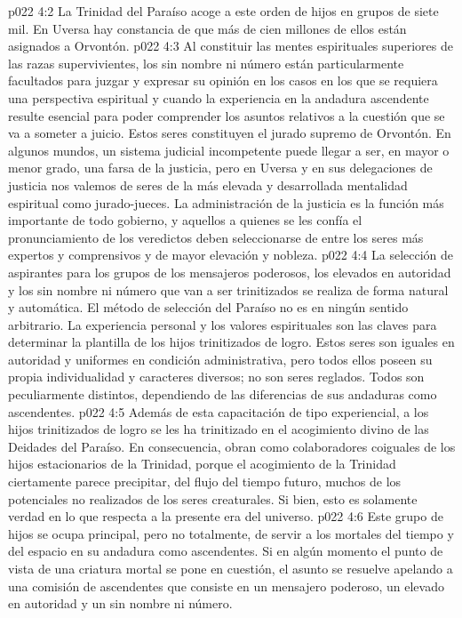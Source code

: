 \vs p022 4:2 La Trinidad del Paraíso acoge a este orden de hijos en grupos de siete mil. En Uversa hay constancia de que más de cien millones de ellos están asignados a Orvontón.
\vs p022 4:3 Al constituir las mentes espirituales superiores de las razas supervivientes, los sin nombre ni número están particularmente facultados para juzgar y expresar su opinión en los casos en los que se requiera una perspectiva espiritual y cuando la experiencia en la andadura ascendente resulte esencial para poder comprender los asuntos relativos a la cuestión que se va a someter a juicio. Estos seres constituyen el jurado supremo de Orvontón. En algunos mundos, un sistema judicial incompetente puede llegar a ser, en mayor o menor grado, una farsa de la justicia, pero en Uversa y en sus delegaciones de justicia nos valemos de seres de la más elevada y desarrollada mentalidad espiritual como jurado\hyp{}jueces. La administración de la justicia es la función más importante de todo gobierno, y aquellos a quienes se les confía el pronunciamiento de los veredictos deben seleccionarse de entre los seres más expertos y comprensivos y de mayor elevación y nobleza.
\vs p022 4:4 \pc La selección de aspirantes para los grupos de los mensajeros poderosos, los elevados en autoridad y los sin nombre ni número que van a ser trinitizados se realiza de forma natural y automática. El método de selección del Paraíso no es en ningún sentido arbitrario. La experiencia personal y los valores espirituales son las claves para determinar la plantilla de los hijos trinitizados de logro. Estos seres son iguales en autoridad y uniformes en condición administrativa, pero todos ellos poseen su propia individualidad y caracteres diversos; no son seres reglados. Todos son peculiarmente distintos, dependiendo de las diferencias de sus andaduras como ascendentes.
\vs p022 4:5 Además de esta capacitación de tipo experiencial, a los hijos trinitizados de logro se les ha trinitizado en el acogimiento divino de las Deidades del Paraíso. En consecuencia, obran como colaboradores coiguales de los hijos estacionarios de la Trinidad, porque el acogimiento de la Trinidad ciertamente parece precipitar, del flujo del tiempo futuro, muchos de los potenciales no realizados de los seres creaturales. Si bien, esto es solamente verdad en lo que respecta a la presente era del universo.
\vs p022 4:6 Este grupo de hijos se ocupa principal, pero no totalmente, de servir a los mortales del tiempo y del espacio en su andadura como ascendentes. Si en algún momento el punto de vista de una criatura mortal se pone en cuestión, el asunto se resuelve apelando a una comisión de ascendentes que consiste en un mensajero poderoso, un elevado en autoridad y un sin nombre ni número.
